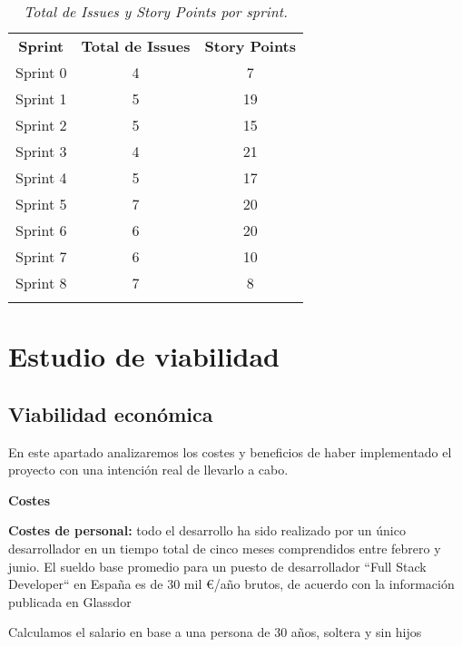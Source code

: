 
\begin{table}[H]
    \centering
    \begin{tabular}{| c | c | c |}
        \Xhline{2\arrayrulewidth}
        \textbf{Sprint} & \textbf{Total de Issues} & \textbf{Story Points} \\ \Xhline{2\arrayrulewidth}
        Sprint 0 & 4 & 7 \\ \hline
        Sprint 1 & 5 & 19 \\ \hline
        Sprint 2 & 5 & 15 \\ \hline
        Sprint 3 & 4 & 21 \\ \hline
        Sprint 4 & 5 & 17 \\ \hline
        Sprint 5 & 7 & 20 \\ \hline
        Sprint 6 & 6 & 20 \\ \hline
        Sprint 7 & 6 & 10 \\ \hline
        Sprint 8 & 7 & 8 \\ \hline
        \Xhline{2\arrayrulewidth}
    \end{tabular}
    \caption{\textit{Total de Issues y Story Points por sprint.}}
\end{table}


\section{Estudio de viabilidad}

\subsection{Viabilidad económica}

En este apartado analizaremos los costes y beneficios de haber implementado el proyecto con una intención real de llevarlo
a cabo.

\textbf{Costes}

\textbf{Costes de personal:} todo el desarrollo ha sido realizado por un único desarrollador en un tiempo total de cinco
meses comprendidos entre febrero y junio.
El sueldo base promedio para un puesto de desarrollador ``Full Stack Developer`` en España es de 30 mil €/año brutos, de acuerdo con
la información publicada en Glassdor\cite{glassdoorSueldo}

Calculamos el salario en base a una persona de 30 años, soltera y sin hijos\cite{seguridadSocial2025}

